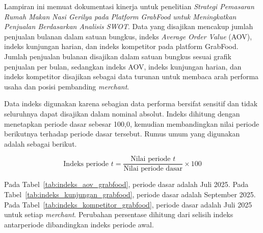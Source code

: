\label{app:dokumentasi-indeks-kinerja}

Lampiran ini memuat dokumentasi kinerja untuk penelitian \textit{Strategi Pemasaran Rumah Makan Nasi Gerilya pada Platform GrabFood untuk Meningkatkan Penjualan Berdasarkan Analisis SWOT}. Data yang disajikan mencakup jumlah penjualan bulanan dalam satuan bungkus, indeks \textit{Average Order Value} (AOV), indeks kunjungan harian, dan indeks kompetitor pada platform GrabFood. Jumlah penjualan bulanan disajikan dalam satuan bungkus sesuai grafik penjualan per bulan, sedangkan indeks AOV, indeks kunjungan harian, dan indeks kompetitor disajikan sebagai data turunan untuk membaca arah performa usaha dan posisi pembanding \textit{merchant}.

Data indeks digunakan karena sebagian data performa bersifat sensitif dan tidak seluruhnya dapat disajikan dalam nominal absolut. Indeks dihitung dengan menetapkan periode dasar sebesar 100,0, kemudian membandingkan nilai periode berikutnya terhadap periode dasar tersebut. Rumus umum yang digunakan adalah sebagai berikut.

\[
    \mbox{Indeks periode } t = \frac{\mbox{Nilai periode } t}{\mbox{Nilai periode dasar}} \times 100
\]

Pada Tabel~\ref{tab:indeks_aov_grabfood}, periode dasar adalah Juli 2025. Pada Tabel~\ref{tab:indeks_kunjungan_grabfood}, periode dasar adalah September 2025. Pada Tabel~\ref{tab:indeks_kompetitor_grabfood}, periode dasar adalah Juli 2025 untuk setiap \textit{merchant}. Perubahan persentase dihitung dari selisih indeks antarperiode dibandingkan indeks periode awal.

